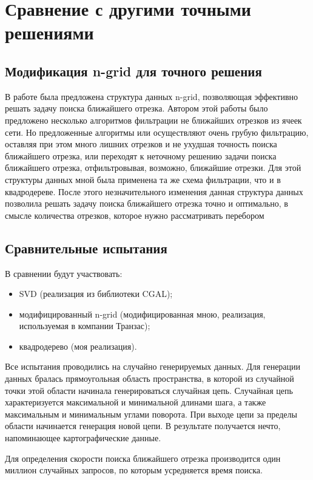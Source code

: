 \chapter{Сравнение с другими точными решениями}
\section{Модификация n-grid для точного решения}

В работе \cite{NGRID} была предложена структура данных n-grid, позволяющая
эффективно решать задачу поиска ближайшего отрезка. Автором этой работы
было предложено несколько алгоритмов фильтрации не ближайших отрезков из
ячеек сети. Но предложенные алгоритмы или осуществляют очень грубую
фильтрацию, оставляя при этом много лишних отрезков и не ухудшая точность
поиска ближайшего отрезка, или переходят к неточному решению задачи
поиска ближайшего отрезка, отфильтровывая, возможно, ближайшие отрезки.
Для этой структуры данных мной была применена та же схема
фильтрации, что и в квадродереве. После этого незначительного изменения
данная структура данных позволила решать задачу поиска ближайшего отрезка
точно и оптимально, в смысле количества отрезков, которое нужно
рассматривать перебором

\section{Сравнительные испытания}

В сравнении будут участвовать:
\begin{itemize}
\item SVD (реализация из библиотеки CGAL);
\item модифицированный n-grid (модифицированная мною, реализация, используемая в компании
Транзас);
\item квадродерево (моя реализация).
\end{itemize}
Все испытания проводились на случайно генерируемых данных. Для
генерации данных бралась прямоугольная область пространства, в которой из
случайной точки этой области начинала генерироваться случайная цепь.
Случайная цепь характеризуется максимальной и минимальной длинами шага,
а также максимальным и минимальным углами поворота. При выходе цепи за
пределы области начинается генерация новой цепи. В результате получается
нечто, напоминающее картографические данные.

Для определения скорости поиска ближайшего отрезка производится один
миллион случайных запросов, по которым усредняется время поиска.

